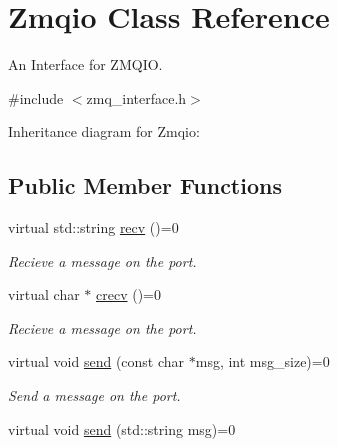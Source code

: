 \hypertarget{classZmqio}{}\section{Zmqio Class Reference}
\label{classZmqio}


An Interface for Z\+M\+Q\+IO.  




{\ttfamily \#include $<$zmq\+\_\+interface.\+h$>$}



Inheritance diagram for Zmqio\+:
\subsection*{Public Member Functions}
\begin{DoxyCompactItemize}
\item 
virtual std\+::string \hyperlink{classZmqio_a9365ac0ed42905898502e16857997acc}{recv} ()=0\hypertarget{classZmqio_a9365ac0ed42905898502e16857997acc}{}\label{classZmqio_a9365ac0ed42905898502e16857997acc}

\begin{DoxyCompactList}\small\item\em Recieve a message on the port. \end{DoxyCompactList}\item 
virtual char $\ast$ \hyperlink{classZmqio_ad6bdb5cb90fb279ce9e2aca553c853f9}{crecv} ()=0\hypertarget{classZmqio_ad6bdb5cb90fb279ce9e2aca553c853f9}{}\label{classZmqio_ad6bdb5cb90fb279ce9e2aca553c853f9}

\begin{DoxyCompactList}\small\item\em Recieve a message on the port. \end{DoxyCompactList}\item 
virtual void \hyperlink{classZmqio_a858e00e8ac5c4d1d60c665fa7c0716f0}{send} (const char $\ast$msg, int msg\+\_\+size)=0\hypertarget{classZmqio_a858e00e8ac5c4d1d60c665fa7c0716f0}{}\label{classZmqio_a858e00e8ac5c4d1d60c665fa7c0716f0}

\begin{DoxyCompactList}\small\item\em Send a message on the port. \end{DoxyCompactList}\item 
virtual void \hyperlink{classZmqio_a079f5752b553ddb2e5a2da565bcf162c}{send} (std\+::string msg)=0\hypertarget{classZmqio_a079f5752b553ddb2e5a2da565bcf162c}{}\label{classZmqio_a079f5752b553ddb2e5a2da565bcf162c}


\end{DoxyCompactItemize}
